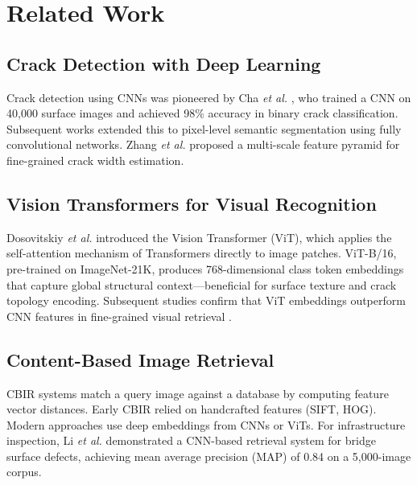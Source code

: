 \documentclass[conference]{IEEEtran}
\begin{document}
\section{Related Work}

\subsection{Crack Detection with Deep Learning}

Crack detection using CNNs was pioneered by Cha \textit{et al.} \cite{ref_crack_cnn}, who trained a CNN on 40,000 surface images and achieved 98\% accuracy in binary crack classification. Subsequent works \cite{ref_deepcrack} extended this to pixel-level semantic segmentation using fully convolutional networks. Zhang \textit{et al.} \cite{ref_crack_seg} proposed a multi-scale feature pyramid for fine-grained crack width estimation.

\subsection{Vision Transformers for Visual Recognition}

Dosovitskiy \textit{et al.} \cite{ref_vit_original} introduced the Vision Transformer (ViT), which applies the self-attention mechanism of Transformers \cite{ref_attention} directly to image patches. ViT-B/16, pre-trained on ImageNet-21K, produces 768-dimensional class token embeddings that capture global structural context---beneficial for surface texture and crack topology encoding. Subsequent studies confirm that ViT embeddings outperform CNN features in fine-grained visual retrieval \cite{ref_vit_retrieval}.

\subsection{Content-Based Image Retrieval}

CBIR \cite{ref_cbir} systems match a query image against a database by computing feature vector distances. Early CBIR relied on handcrafted features (SIFT, HOG). Modern approaches use deep embeddings from CNNs \cite{ref_deep_cbir} or ViTs. For infrastructure inspection, Li \textit{et al.} \cite{ref_infra_cbir} demonstrated a CNN-based retrieval system for bridge surface defects, achieving mean average precision (MAP) of 0.84 on a 5,000-image corpus.
\end{document}
